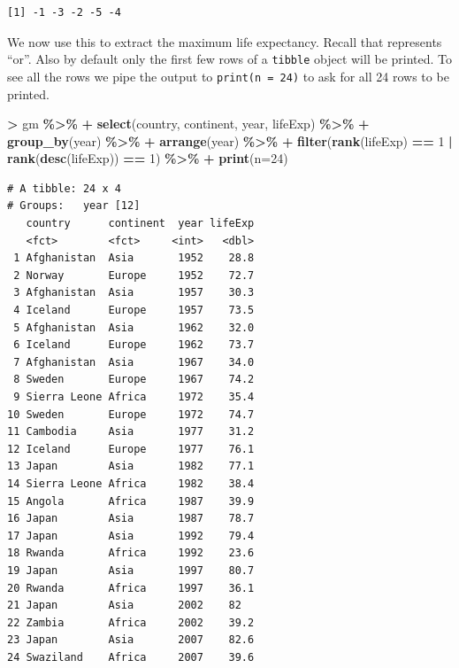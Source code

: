 \documentclass[
]{krantz}
\makeatletter
\newenvironment{Shaded}{\begin{snugshade}}{\end{snugshade}}
\newcommand{\DataTypeTok}[1]{\textcolor[rgb]{0.27,0.27,0.27}{#1}}
\newcommand{\DecValTok}[1]{\textcolor[rgb]{0.06,0.06,0.06}{#1}}
\newcommand{\KeywordTok}[1]{\textcolor[rgb]{0.27,0.27,0.27}{\textbf{#1}}}
\newcommand{\NormalTok}[1]{#1}
\newcommand{\OperatorTok}[1]{\textcolor[rgb]{0.43,0.43,0.43}{\textbf{#1}}}
\newcommand{\StringTok}[1]{\textcolor[rgb]{0.5,0.5,0.5}{#1}}
\newenvironment{kframe}{%
\medskip{}
\setlength{\fboxsep}{.8em}
 \def\at@end@of@kframe{}%
 \ifinner\ifhmode%
  \def\at@end@of@kframe{\end{minipage}}%
  \begin{minipage}{\columnwidth}%
 \fi\fi%
 \def\FrameCommand##1{\hskip\@totalleftmargin \hskip-\fboxsep
 \colorbox{shadecolor}{##1}\hskip-\fboxsep
     \hskip-\linewidth \hskip-\@totalleftmargin \hskip\columnwidth}%
 \MakeFramed {\advance\hsize-\width
   \@totalleftmargin\z@ \linewidth\hsize
   \@setminipage}}%
 {\par\unskip\endMakeFramed%
 \at@end@of@kframe}
\renewenvironment{Shaded}{\begin{kframe}}{\end{kframe}}
\makeatother
\begin{document}
\begin{verbatim}
[1] -1 -3 -2 -5 -4
\end{verbatim}

We now use this to extract the maximum life expectancy. Recall that \texttt{\textbar{}} represents ``or''. Also by default only the first few rows of a \texttt{tibble} object will be printed. To see all the rows we pipe the output to \texttt{print(n\ =\ 24)} to ask for all 24 rows to be printed.

\begin{Shaded}
\begin{Highlighting}[]
\OperatorTok{\textgreater{}}\StringTok{ }\NormalTok{gm }\OperatorTok{\%\textgreater{}\%}\StringTok{ }
\OperatorTok{+}\StringTok{   }\KeywordTok{select}\NormalTok{(country, continent, year, lifeExp) }\OperatorTok{\%\textgreater{}\%}\StringTok{ }
\OperatorTok{+}\StringTok{   }\KeywordTok{group\_by}\NormalTok{(year) }\OperatorTok{\%\textgreater{}\%}\StringTok{ }
\OperatorTok{+}\StringTok{   }\KeywordTok{arrange}\NormalTok{(year) }\OperatorTok{\%\textgreater{}\%}\StringTok{ }
\OperatorTok{+}\StringTok{   }\KeywordTok{filter}\NormalTok{(}\KeywordTok{rank}\NormalTok{(lifeExp) }\OperatorTok{==}\StringTok{ }\DecValTok{1} \OperatorTok{|}\StringTok{ }\KeywordTok{rank}\NormalTok{(}\KeywordTok{desc}\NormalTok{(lifeExp)) }\OperatorTok{==}\StringTok{ }\DecValTok{1}\NormalTok{) }\OperatorTok{\%\textgreater{}\%}\StringTok{ }
\OperatorTok{+}\StringTok{   }\KeywordTok{print}\NormalTok{(}\DataTypeTok{n=}\DecValTok{24}\NormalTok{)}
\end{Highlighting}
\end{Shaded}

\begin{verbatim}
# A tibble: 24 x 4
# Groups:   year [12]
   country      continent  year lifeExp
   <fct>        <fct>     <int>   <dbl>
 1 Afghanistan  Asia       1952    28.8
 2 Norway       Europe     1952    72.7
 3 Afghanistan  Asia       1957    30.3
 4 Iceland      Europe     1957    73.5
 5 Afghanistan  Asia       1962    32.0
 6 Iceland      Europe     1962    73.7
 7 Afghanistan  Asia       1967    34.0
 8 Sweden       Europe     1967    74.2
 9 Sierra Leone Africa     1972    35.4
10 Sweden       Europe     1972    74.7
11 Cambodia     Asia       1977    31.2
12 Iceland      Europe     1977    76.1
13 Japan        Asia       1982    77.1
14 Sierra Leone Africa     1982    38.4
15 Angola       Africa     1987    39.9
16 Japan        Asia       1987    78.7
17 Japan        Asia       1992    79.4
18 Rwanda       Africa     1992    23.6
19 Japan        Asia       1997    80.7
20 Rwanda       Africa     1997    36.1
21 Japan        Asia       2002    82  
22 Zambia       Africa     2002    39.2
23 Japan        Asia       2007    82.6
24 Swaziland    Africa     2007    39.6
\end{verbatim}
\end{document}
